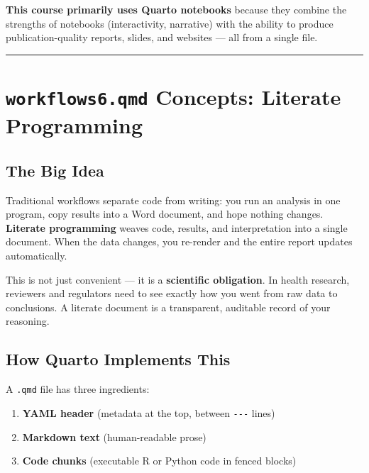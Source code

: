 \documentclass[
  letterpaper,
  DIV=11,
  numbers=noendperiod,
  oneside]{scrreprt}
\providecommand{\tightlist}{%
  \setlength{\itemsep}{0pt}\setlength{\parskip}{0pt}}
\begin{document}
\textbf{This course primarily uses Quarto notebooks} because they
combine the strengths of notebooks (interactivity, narrative) with the
ability to produce publication-quality reports, slides, and websites ---
all from a single file.

\begin{center}\rule{0.5\linewidth}{0.5pt}\end{center}

\section*{\texorpdfstring{\texttt{workflows6.qmd} Concepts: Literate
Programming}{workflows6.qmd Concepts: Literate Programming}}\label{workflows6.qmd-concepts-literate-programming}


\subsection*{The Big Idea}\label{the-big-idea}

Traditional workflows separate code from writing: you run an analysis in
one program, copy results into a Word document, and hope nothing
changes. \textbf{Literate programming} weaves code, results, and
interpretation into a single document. When the data changes, you
re-render and the entire report updates automatically.

This is not just convenient --- it is a \textbf{scientific obligation}.
In health research, reviewers and regulators need to see exactly how you
went from raw data to conclusions. A literate document is a transparent,
auditable record of your reasoning.

\subsection*{How Quarto Implements
This}\label{how-quarto-implements-this}

A \texttt{.qmd} file has three ingredients:

\begin{enumerate}
\def\labelenumi{\arabic{enumi}.}
\tightlist
\item
  \textbf{YAML header} (metadata at the top, between \texttt{-\/-\/-}
  lines)
\item
  \textbf{Markdown text} (human-readable prose)
\item
  \textbf{Code chunks} (executable R or Python code in fenced blocks)
\end{enumerate}
\end{document}
